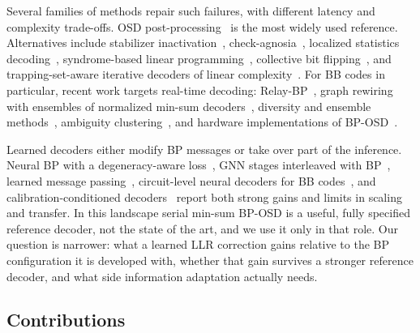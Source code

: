 \documentclass[a4paper,twocolumn,11pt,nopdfoutputerror]{quantumarticle}
\begin{document}
Several families of methods repair such failures, with different latency
and complexity trade-offs. OSD post-processing~\cite{Fossorier1995OSD,Panteleev2021QLDPC,Roffe2020Landscape}
is the most widely used reference. Alternatives include stabilizer
inactivation~\cite{duCrest2022Inactivation},
check-agnosia~\cite{duCrest2024CheckAgnosia}, localized statistics
decoding~\cite{Hillmann2025LSD}, syndrome-based linear
programming~\cite{Javed2026LP}, collective bit
flipping~\cite{Chytas2025Collective}, and trapping-set-aware iterative
decoders of linear complexity~\cite{Pradhan2026Linear}. For BB codes in
particular, recent work targets real-time decoding: Relay-BP~\cite{Muller2025Relay},
graph rewiring with ensembles of normalized min-sum
decoders~\cite{Maan2026Correlated}, diversity and ensemble
methods~\cite{GarciaHerrero2026Diversity}, ambiguity
clustering~\cite{Wolanski2024Ambiguity}, and hardware implementations of
BP-OSD~\cite{Bascones2025FPGA}.

Learned decoders either modify BP messages or take over part of the
inference. Neural BP with a degeneracy-aware loss~\cite{Liu2019Neural},
GNN stages interleaved with BP~\cite{Gong2024GNN}, learned message
passing~\cite{Maan2025MLBP}, circuit-level neural decoders for BB
codes~\cite{Blue2026MLBB}, and calibration-conditioned
decoders~\cite{Stein2026FiLM} report both strong gains and limits in
scaling and transfer. In this landscape serial min-sum BP-OSD is a useful,
fully specified reference decoder, not the state of the art, and we use it
only in that role. Our question is narrower: what a learned LLR correction
gains relative to the BP configuration it is developed with, whether that
gain survives a stronger reference decoder, and what side information
adaptation actually needs.

\subsection{Contributions}\label{sec:contributions}
\end{document}
